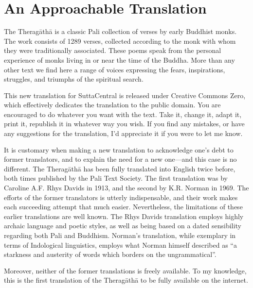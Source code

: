 \documentclass[10pt, openany]{book}
\begin{document}
\tableofcontents 

\mainmatter

\pagestyle{fancy}

\chapter*{An Approachable Translation}

\setlength{\parskip}{0cm}

The Theragāthā is a classic Pali collection of verses by early Buddhist monks. The work consists of 1289 verses, collected according to the monk with whom they were traditionally associated. These poems speak from the personal experience of monks living in or near the time of the Buddha. More than any other text we find here a range of voices expressing the fears, inspirations, struggles, and triumphs of the spiritual search.

This new translation for SuttaCentral is released under Creative Commons Zero, which effectively dedicates the translation to the public domain. You are encouraged to do whatever you want with the text. Take it, change it, adapt it, print it, republish it in whatever way you wish. If you find any mistakes, or have any suggestions for the translation, I’d appreciate it if you were to let me know.

It is customary when making a new translation to acknowledge one’s debt to former translators, and to explain the need for a new one—and this case is no different. The Theragāthā has been fully translated into English twice before, both times published by the Pali Text Society. The first translation was by Caroline A.F. Rhys Davids in 1913, and the second by K.R. Norman in 1969. The efforts of the former translators is utterly indispensable, and their work makes each succeeding attempt that much easier. Nevertheless, the limitations of these earlier translations are well known. The Rhys Davids translation employs highly archaic language and poetic styles, as well as being based on a dated sensibility regarding both Pali and Buddhism. Norman’s translation, while exemplary in terms of Indological linguistics, employs what Norman himself described as “a starkness and austerity of words which borders on the ungrammatical”.

Moreover, neither of the former translations is freely available. To my knowledge, this is the first translation of the Theragāthā to be fully available on the internet.
\end{document}
